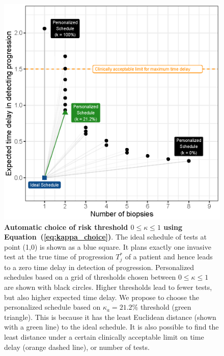 \begin{figure}
\centerline{\includegraphics{images/kappa_choice_102.eps}}
\caption{\textbf{Automatic choice of risk threshold $0 \leq \kappa \leq 1$ using Equation~(\ref{eq:kappa_choice})}. The ideal schedule of tests at point (1,0) is shown as a blue square. It plans exactly one invasive test at the true time of progression $T^*_j$ of a patient and hence leads to a zero time delay in detection of progression. Personalized schedules based on a grid of thresholds chosen between $0 \leq \kappa \leq 1$ are shown with black circles. Higher thresholds lead to fewer tests, but also higher expected time delay. We propose to choose the personalized schedule based on $\kappa_a=21.2\%$ threshold (green triangle). This is because it has the least Euclidean distance (shown with a green line) to the ideal schedule. It is also possible to find the least distance under a certain clinically acceptable limit on time delay (orange dashed line), or number of tests.}
\label{fig:kappa_choice}
\end{figure}

